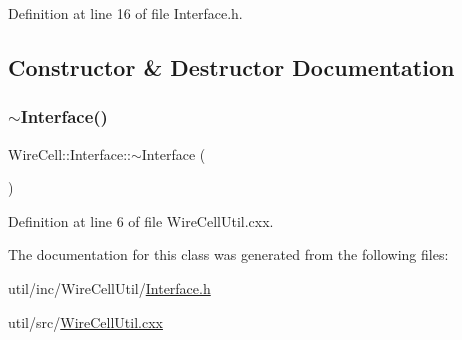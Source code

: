 Definition at line 16 of file Interface.\+h.



\subsection{Constructor \& Destructor Documentation}
\mbox{\label{class_wire_cell_1_1_interface_ae292f3fca9fbe492570f8992540b5d9f}} 
\subsubsection{\texorpdfstring{$\sim$\+Interface()}{~Interface()}}
{\footnotesize\ttfamily Wire\+Cell\+::\+Interface\+::$\sim$\+Interface (\begin{DoxyParamCaption}{ }\end{DoxyParamCaption})\hspace{0.3cm}{\ttfamily [virtual]}}



Definition at line 6 of file Wire\+Cell\+Util.\+cxx.



The documentation for this class was generated from the following files\+:\begin{DoxyCompactItemize}
\item 
util/inc/\+Wire\+Cell\+Util/\hyperlink{_interface_8h}{Interface.\+h}\item 
util/src/\hyperlink{_wire_cell_util_8cxx}{Wire\+Cell\+Util.\+cxx}\end{DoxyCompactItemize}
